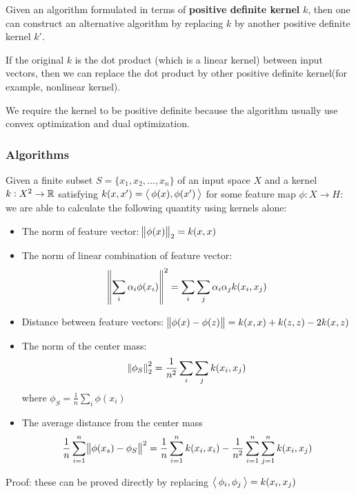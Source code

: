 \begin{refsection}
\begin{mdframed}
	Given an algorithm formulated in terms of \textbf{positive definite kernel }$k$, then one can construct an alternative algorithm by replacing $k$ by another positive definite kernel $k'$.
\end{mdframed}

\begin{remark}
	If the original $k$ is the dot product (which is a linear kernel) between input vectors, then we can replace the dot product by other positive definite kernel(for example, nonlinear kernel). 
\end{remark}

\begin{remark}
	We require the kernel to be positive definite because the algorithm usually use convex optimization and dual optimization.
\end{remark}

\subsubsection{Algorithms}
\begin{theorem}
	\cite[114]{shawe2004kernel}
	Given a finite subset $S=\{x_1,x_2,...,x_n\}$ of an input space $X$ and a kernel $k:X^2\to \mathbb{R}$ satisfying $k(x,x')={\left< \, \phi(x),\phi(x') \, \right>}$ for some feature map $\phi:X\to H$: we are able to calculate the following quantity using kernels alone:
	\begin{itemize}
		\item The norm of feature vector: $\norm{\phi(x)}_2 = k(x,x)$
		\item The norm of linear combination of feature vector: $$\norm{\sum_{i} \alpha_i \phi(x_i)}^2 = \sum_{i}\sum_j \alpha_i\alpha_j k(x_i,x_j)$$
		\item Distance between feature vectors: 
		$\norm{\phi(x) - \phi(z)} = k(x,x) + k(z,z) - 2k(x,z)$
		\item The norm of the center mass: 
		$$\norm{\phi_S}_2^2 = \frac{1}{n^2} \sum_i \sum_j k(x_i,x_j)$$
		where $\phi_S = \frac{1}{n}\sum_i \phi(x_i)$
		\item The average distance from the center mass 
		$$\frac{1}{n}\sum_{i=1}^n \norm{\phi(x_s) - \phi_S}^2 = \frac{1}{n}\sum_{i=1}^n k(x_i,x_i) - \frac{1}{n^2} \sum_{i=1}^n \sum_{j=1}^n k(x_i,x_j)$$
	\end{itemize}
\end{theorem}
Proof: these can be proved directly by replacing ${\left< \, \phi_i,\phi_j \, \right>} = k(x_i,x_j)$




\end{refsection}
